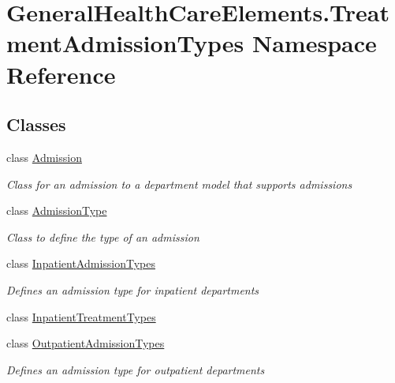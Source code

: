 \hypertarget{namespace_general_health_care_elements_1_1_treatment_admission_types}{}\section{General\+Health\+Care\+Elements.\+Treatment\+Admission\+Types Namespace Reference}
\label{namespace_general_health_care_elements_1_1_treatment_admission_types}
\subsection*{Classes}
\begin{DoxyCompactItemize}
\item 
class \hyperlink{class_general_health_care_elements_1_1_treatment_admission_types_1_1_admission}{Admission}
\begin{DoxyCompactList}\small\item\em Class for an admission to a department model that supports admissions \end{DoxyCompactList}\item 
class \hyperlink{class_general_health_care_elements_1_1_treatment_admission_types_1_1_admission_type}{Admission\+Type}
\begin{DoxyCompactList}\small\item\em Class to define the type of an admission \end{DoxyCompactList}\item 
class \hyperlink{class_general_health_care_elements_1_1_treatment_admission_types_1_1_inpatient_admission_types}{Inpatient\+Admission\+Types}
\begin{DoxyCompactList}\small\item\em Defines an admission type for inpatient departments \end{DoxyCompactList}\item 
class \hyperlink{class_general_health_care_elements_1_1_treatment_admission_types_1_1_inpatient_treatment_types}{Inpatient\+Treatment\+Types}
\item 
class \hyperlink{class_general_health_care_elements_1_1_treatment_admission_types_1_1_outpatient_admission_types}{Outpatient\+Admission\+Types}
\begin{DoxyCompactList}\small\item\em Defines an admission type for outpatient departments \end{DoxyCompactList}\item 

\end{DoxyCompactItemize}
